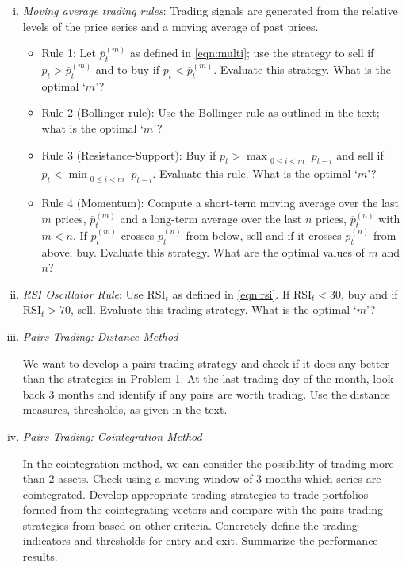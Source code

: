 	\begin{enumerate}[(i)]
	\item{\it Moving average trading rules}: Trading signals are generated from the relative levels of the price series and a moving average of past prices.
		\begin{itemize}
		\item  Rule 1: Let $\overline{p}_t^{(m)}$ as defined in \eqref{eqn:multi}; use the strategy to sell if $p_t>\overline{p}_t^{(m)}$ and to buy if  $p_t<\overline{p}_t^{(m)}$. Evaluate this strategy. What is the optimal `$m$'?
		\item Rule 2 (Bollinger rule): Use the Bollinger rule as outlined in the text; what is the optimal `$m$'?
		\item Rule 3 (Resistance-Support): Buy if $p_t > \max_{\substack{0\le i< m}}p_{t-i}$ and sell if $p_t < \min_{\substack{0\le i< m}}p_{t-i}$. Evaluate this rule. What is the optimal `$m$'?
		\item Rule 4 (Momentum): Compute a short-term moving average over the last $m$ prices, $\overline{p}_t^{(m)}$ and a long-term average over the last $n$ prices, $\overline{p}_t^{(n)}$ with $m<n$. If $\overline{p}_t^{(m)}$ crosses $\overline{p}_t^{(n)}$ from below, sell and if it crosses $\overline{p}_t^{(n)}$ from above, buy. Evaluate this strategy. What are the optimal values of $m$ and $n$?
		\end{itemize}
	\item{\it RSI Oscillator Rule}: Use $\text{RSI}_t$ as defined in \eqref{eqn:rsi}. \hfill \break
If $\text{RSI}_t<30$, buy and if $\text{RSI}_t>70$, sell. Evaluate this trading strategy. What is the optimal `$m$'?

	\item {\it Pairs Trading: Distance Method}

We want to develop a pairs trading strategy and check if it does any better than  the strategies in Problem 1. At the last trading day of the month, look back 3 months and identify if any pairs are worth trading. Use the distance measures, thresholds, as given in the text.

	\item {\it Pairs Trading: Cointegration Method}

In the cointegration method, we can consider the possibility of trading more than 2 assets. Check using a moving window of 3 months which series are cointegrated. Develop appropriate trading strategies to trade portfolios formed from the cointegrating vectors and compare with the pairs trading strategies from based on other criteria. Concretely define the trading indicators and thresholds for entry and exit. Summarize the performance results.


\end{enumerate}
